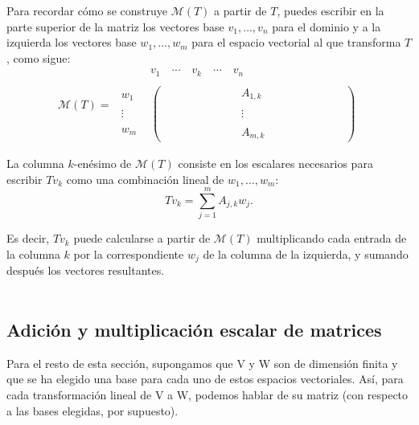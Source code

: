 Para recordar cómo se construye $\mathcal{M}(T)$ a partir de $T$, puedes escribir en la parte superior de la matriz los vectores base $v_1,\ldots,v_n$ para el dominio y a la izquierda los vectores base $w_1,\ldots,w_m$ para el espacio vectorial al que transforma $T$, como sigue:
$$
\mathcal{M}(T)=
    \begin{array}{cc}
	&v_1 \quad \cdots\quad v_k \quad \cdots \quad v_n\\\\
	\begin{array}{c}
	    w_1\\\\
	    \vdots\\\\
	    w_m
	\end{array}
	&
	\begin{pmatrix}
	    \qquad\qquad\qquad&A_{1,k}&\qquad\qquad\qquad\\\\
		  &\vdots&\\\\
		  &A_{m,k}&
	\end{pmatrix}
    \end{array}
$$

La columna $k$-enésimo de $\mathcal{M}(T)$ consiste en los escalares necesarios para escribir $Tv_k$ como una combinación lineal de $w_1,\ldots,w_m$:
$$Tv_k=\sum_{j=1}^m A_{j,k}w_j.$$

Es decir, $Tv_{k}$ puede calcularse a partir de $\mathcal{M}(T)$ multiplicando cada entrada de la columna $k$ por la correspondiente $w_j$ de la columna de la izquierda, y sumando después los vectores resultantes.\\\\


\subsection*{Adición y multiplicación escalar de matrices}

Para el resto de esta sección, supongamos que V y W son de dimensión finita y que se ha elegido una base para cada uno de estos espacios vectoriales. Así, para cada transformación lineal de V a W, podemos hablar de su matriz (con respecto a las bases elegidas, por supuesto).

